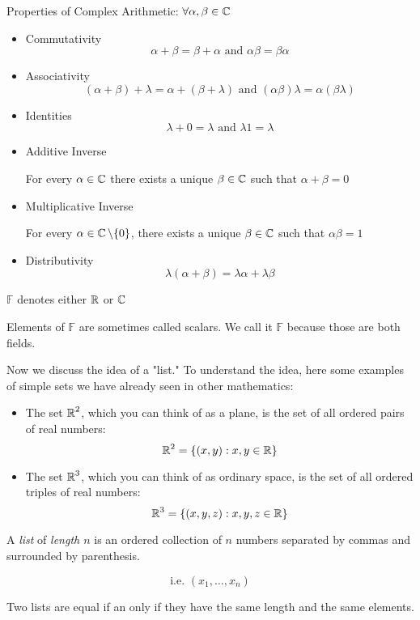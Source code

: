 \begin{note} 
    Properties of Complex Arithmetic: $\forall \alpha, \beta \in \operatorname{\mathbb{C}}$
    \begin{itemize}
        \item Commutativity
        \[ \alpha + \beta = \beta + \alpha \text{ and } \alpha \beta = \beta \alpha\]
        \item Associativity
        \[ (\alpha + \beta) + \lambda = \alpha + (\beta + \lambda) \text{ and } (\alpha\beta)\lambda = \alpha(\beta \lambda) \]
        \item Identities
        \[ \lambda + 0 = \lambda \text{ and } \lambda 1 = \lambda \]
        \item Additive Inverse
        \begin{center}
           For every $\alpha \in \operatorname{\mathbb{C}}$ there exists a unique $\beta \in \operatorname{\mathbb{C}}$ such that $\alpha + \beta = 0$ 
        \end{center}
        \item Multiplicative Inverse
        \begin{center}
            For every  $\alpha \in \operatorname{\mathbb{C}} \setminus \{0\}$, there exists a unique $\beta \in \operatorname{\mathbb{C}}$ such that $\alpha \beta = 1$ 
        \end{center}
        \item Distributivity
        \[ \lambda(\alpha + \beta) = \lambda \alpha + \lambda \beta \]
    \end{itemize}
\end{note}

\begin{definition}
    $\mathbb{F}$ denotes either $\operatorname{\mathbb{R}}$ or $\operatorname{\mathbb{C}}$
\end{definition}
Elements of $\mathbb{F}$ are sometimes called scalars.
We call it $\mathbb{F}$ because those are both fields.

Now we discuss the idea of a "list." To understand the idea, here some examples of
simple sets we have already seen in other mathematics:
\begin{itemize}
    \item The set $\operatorname{\mathbb{R}}^2$, which you can think of as a plane, is the set of all ordered
    pairs of real numbers:
    \[ \operatorname{\mathbb{R}}^2 = \{(x, y) : x, y \in \operatorname{\mathbb{R}}\} \]
    \item The set $\operatorname{\mathbb{R}}^3$, which you can think of as ordinary space, is the set of all
    ordered triples of real numbers:
    \[ \operatorname{\mathbb{R}}^3 = \{(x, y, z) : x, y, z \in \operatorname{\mathbb{R}}\} \]
\end{itemize}

\begin{definition}
    A \textit{list} of \textit{length $n$} is an ordered collection of $n$ numbers
    separated by commas and surrounded by parenthesis.
    
    \[ \text{i.e. }(x_1, \ldots, x_n) \]
    
    Two lists are equal if an only if they have the same length and the same elements. 
\end{definition}

